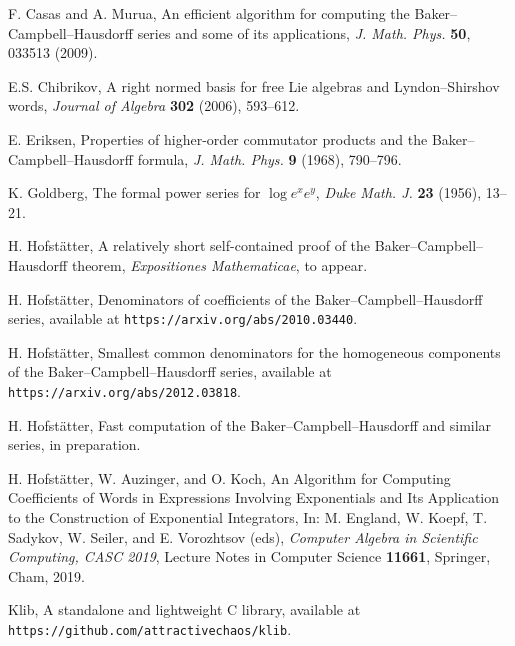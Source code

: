 \documentclass[11pt,a4paper]{article}
\begin{document}
\begin{thebibliography}{10}\footnotesize

F. Casas and A. Murua, An efficient algorithm for computing the Baker--Campbell--Hausdorff series
and some of its applications, {\em J. Math. Phys.} {\bf 50}, 033513 (2009).

E.S. Chibrikov, A right normed basis for free Lie algebras and Lyndon--Shirshov
  words, {\em Journal of Algebra} {\bf 302} (2006), 593--612.


 E. Eriksen, Properties of higher-order commutator products and the
    Baker--Campbell--Hausdorff formula, {\em J. Math. Phys.} {\bf 9} (1968), 790--796.

 K. Goldberg, The formal power series for $\log e^x e^y$, {\it Duke Math. J.} {\bf 23} (1956), 13--21.

 H. Hofst\"atter, A relatively short self-contained proof of the Baker--Campbell--Hausdorff theorem, {\it Expositiones Mathematicae}, to appear. %


 H. Hofst\"atter, Denominators of coefficients of the Baker--Campbell--Hausdorff series, available at {\tt https://arxiv.org/abs/2010.03440}.

 H. Hofst\"atter, Smallest common denominators for the homogeneous components of the Baker--Campbell--Hausdorff series, available at {\tt https://arxiv.org/abs/2012.03818}.

 H. Hofst\"atter, Fast computation of the Baker--Campbell--Hausdorff and similar series, in preparation.


 H. Hofstätter, W. Auzinger, and O. Koch,   An Algorithm for Computing Coefficients of Words in Expressions Involving Exponentials and Its Application to the Construction of Exponential Integrators, In: M. England, W. Koepf, T. Sadykov, W. Seiler, and E. Vorozhtsov (eds), {\it Computer Algebra in Scientific Computing, CASC 2019}, Lecture Notes in Computer Science {\bf 11661}, Springer, Cham, 2019. 

  Klib, A standalone and lightweight C library, available at {\tt https://github.com/attractivechaos/klib}.


\end{thebibliography}
\end{document}
